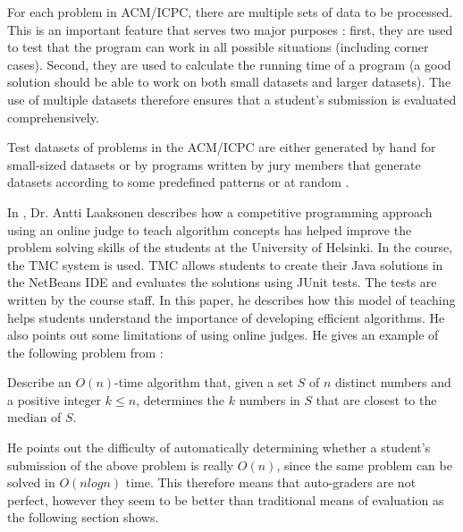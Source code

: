\documentclass[12pt]{article}
\begin{document}
		For each problem in ACM/ICPC, there are multiple sets of data to be processed. This is an important feature that serves two major purposes \cite{ojpot}: first, they are used to test that the program can work in all possible situations (including corner cases). Second, they are used to calculate the running time of a program (a good solution should be able to work on both small datasets and larger datasets). The use of multiple datasets therefore ensures that a student’s submission is evaluated comprehensively. 
		
		Test datasets of problems in the ACM/ICPC are either generated by hand for small-sized datasets or by programs written by jury members that generate datasets according to some predefined patterns or at random \cite{budzalov}.
		
		In \cite{anti}, Dr. Antti Laaksonen describes how a competitive programming approach using an online judge to teach algorithm concepts has helped improve the problem solving skills of the students at the University of Helsinki. In 		the course, the TMC system \cite{tmc} is used. TMC allows students to create their Java solutions in the NetBeans IDE and evaluates the solutions using JUnit tests. The tests are written by the course staff. In this paper, he describes how this model of teaching helps students understand the importance of developing efficient algorithms. He also points out some limitations of using online judges. He gives an example of the following problem from \cite{clrs}:
		
		Describe an $O(n)$-time algorithm that, given a set $S$ of $𝑛$ distinct numbers and a positive integer $k \leq n$, determines the $k$ numbers in $S$ that are closest to the median of $S$. 
		
		He points out the difficulty of automatically determining whether a student’s submission of the above problem is really $O(n)$, since the same problem can be solved in $O(n log n)$ time. This therefore means that auto-graders are not perfect, however they seem to be better than traditional means of evaluation as the following section shows.
\end{document}

